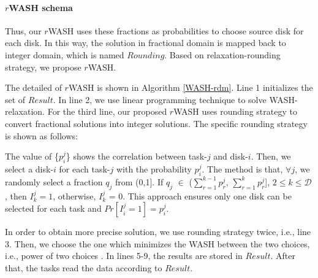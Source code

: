 \documentclass[conference]{IEEEtran}
\begin{document}
 \paragraph{\textbf{$r$WASH schema}} 

Thus, our $r$WASH uses these fractions as probabilities to choose source disk for each disk. In this way, the solution in fractional domain is mapped back to integer domain, which is named $Rounding$. 
Based on relaxation-rounding strategy, we propose $r$WASH. 

The detailed of $r$WASH is shown in Algorithm \ref{WASH-rdm}. Line 1 initializes the set of $Result$. In line 2, we use linear programming technique to solve WASH-relaxation. For the third line, our proposed $r$WASH uses rounding strategy to convert fractional solutions into integer solutions. The specific rounding strategy is shown as follows:
 
The value of \{$p_i^j$\}  shows the correlation between task-$j$ and disk-$i$. Then, we select a disk-$i$ for each task-$j$ with the probability $p_i^j$. The method is that, $\forall j$, we randomly select a fraction $q_j$ from (0,1]. If $q_j$ $\in$ ($\sum\nolimits_{r = 1}^{k-1} p_{r}^{j}$,  $\sum\nolimits_{r = 1}^{k} p_{r}^{j}$], $2 \leq k \leq \mathcal{D} $, then $I_k^j = 1$, otherwise, $I_k^j$ = 0. This approach ensures only one disk can be selected for each task and $Pr[I_i^j = 1] = p_i^j$.

In order to obtain more precise solution, we use rounding strategy twice, i.e., line 3. Then, we choose the one which minimizes the WASH between the two choices, i.e., power of two choices \cite{b43}. In lines 5-9, the results are stored in $Result$. After that, the tasks read the data according to $Result$. 
\end{document}
